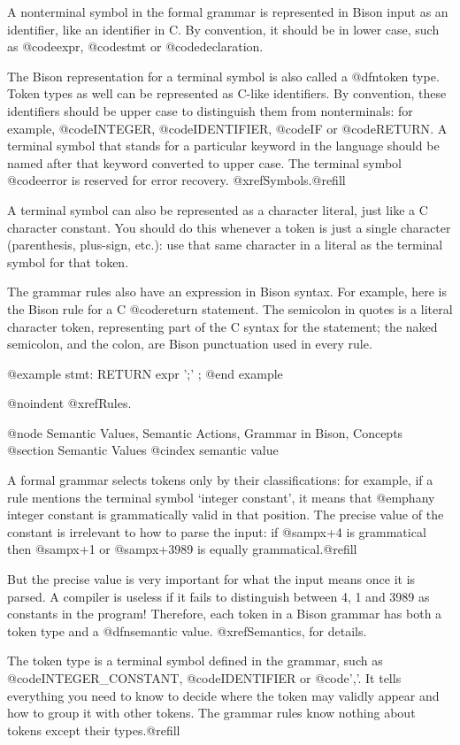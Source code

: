 A nonterminal symbol in the formal grammar is represented in Bison input
as an identifier, like an identifier in C.  By convention, it should be
in lower case, such as @code{expr}, @code{stmt} or @code{declaration}.

The Bison representation for a terminal symbol is also called a @dfn{token
type}.  Token types as well can be represented as C-like identifiers.  By
convention, these identifiers should be upper case to distinguish them from
nonterminals: for example, @code{INTEGER}, @code{IDENTIFIER}, @code{IF} or
@code{RETURN}.  A terminal symbol that stands for a particular keyword in
the language should be named after that keyword converted to upper case.
The terminal symbol @code{error} is reserved for error recovery.
@xref{Symbols}.@refill

A terminal symbol can also be represented as a character literal, just like
a C character constant.  You should do this whenever a token is just a
single character (parenthesis, plus-sign, etc.): use that same character in
a literal as the terminal symbol for that token.

The grammar rules also have an expression in Bison syntax.  For example,
here is the Bison rule for a C @code{return} statement.  The semicolon in
quotes is a literal character token, representing part of the C syntax for
the statement; the naked semicolon, and the colon, are Bison punctuation
used in every rule.

@example
stmt:   RETURN expr ';'
        ;
@end example

@noindent
@xref{Rules}.

@node Semantic Values, Semantic Actions, Grammar in Bison, Concepts
@section Semantic Values
@cindex semantic value

A formal grammar selects tokens only by their classifications: for example,
if a rule mentions the terminal symbol `integer constant', it means that
@emph{any} integer constant is grammatically valid in that position.  The
precise value of the constant is irrelevant to how to parse the input: if
@samp{x+4} is grammatical then @samp{x+1} or @samp{x+3989} is equally
grammatical.@refill

But the precise value is very important for what the input means once it is
parsed.  A compiler is useless if it fails to distinguish between 4, 1 and
3989 as constants in the program!  Therefore, each token in a Bison grammar
has both a token type and a @dfn{semantic value}.  @xref{Semantics},
for details.

The token type is a terminal symbol defined in the grammar, such as
@code{INTEGER_CONSTANT}, @code{IDENTIFIER} or @code{','}.  It tells
everything you need to know to decide where the token may validly appear
and how to group it with other tokens.  The grammar rules know nothing
about tokens except their types.@refill

